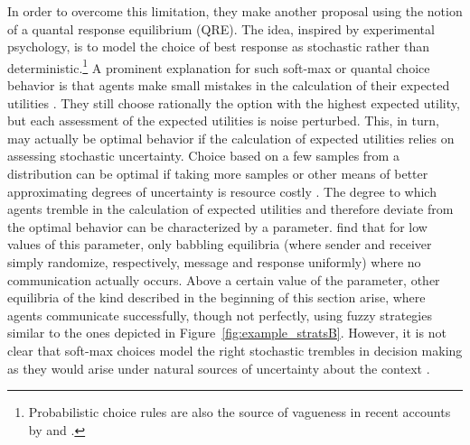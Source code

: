 \documentclass[a4paper]{article}
\begin{document}
In order to overcome this limitation, they make another proposal using the notion of a quantal response equilibrium (QRE).
The idea, inspired by experimental psychology, is to model the choice of best response as stochastic rather than deterministic.\footnote{Probabilistic choice rules are also the source of vagueness in recent accounts by \textcite{LassiterGoodman2015:Adjectival-vagu} and \textcite{QingFranke2014:Gradable-Adject}.} 
A prominent explanation for such soft-max or quantal choice behavior is that agents make small mistakes in the calculation of their expected utilities \parencite{Train2009:Discrete-Choice}. 
They still choose rationally the option with the highest expected utility, but each assessment of the expected utilities is noise perturbed.
This, in turn, may actually be optimal behavior if the calculation of expected utilities relies on assessing stochastic uncertainty. 
Choice based on a few samples from a distribution can be optimal if taking more samples or other means of better approximating degrees of uncertainty is resource costly \parencite[\emph{e.g.}][]{VulGoodman2014:One-and-Done-Op,SanbornChater2016:Bayesian-Brains}.
The degree to which agents tremble in the calculation of expected utilities and therefore deviate from the optimal behavior can be characterized by a parameter.
\textcite{franke_vagueness_2011} find that for low values of this parameter, only babbling equilibria (where sender and receiver simply randomize, respectively, message and response uniformly) where no communication actually occurs.
Above a certain value of the parameter, other equilibria of the kind described in the beginning of this section arise, where agents communicate successfully, though not perfectly, using fuzzy strategies similar to the ones depicted in Figure~\ref{fig:example_stratsB}. However, it is not clear that soft-max choices model the right stochastic trembles in decision making as they would arise under natural sources of uncertainty about the context \parencite[see][]{franke_vagueness_2017}.
\end{document}
